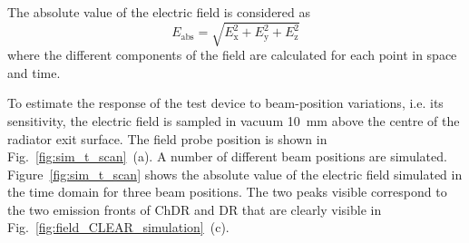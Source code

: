The absolute value of the electric field is considered as
\begin{equation}
E_\text{abs} = \sqrt{ E^2_\text{x} + E^2_\text{y} + E^2_\text{z} }
\end{equation}
where the different components of the field are calculated for each point in space and time. 

To estimate the response of the test device to beam-position variations, i.e. its sensitivity, the electric field is sampled in vacuum 10~mm above the centre of the radiator exit surface. The field probe position is shown in Fig.~\ref{fig:sim_t_scan}~(a). A number of different beam positions are simulated. Figure~\ref{fig:sim_t_scan} shows the absolute value of the electric field simulated in the time domain for three beam positions. The two peaks visible correspond to the two emission fronts of ChDR and DR that are clearly visible in Fig.~\ref{fig:field_CLEAR_simulation}~(c). 






